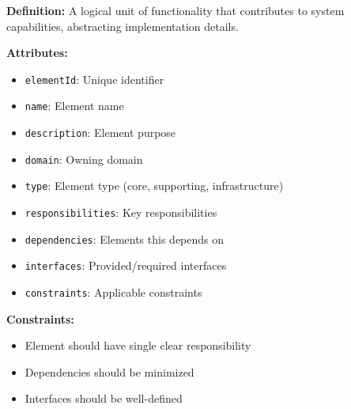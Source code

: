 \documentclass[11pt,letterpaper]{article}
\begin{document}
\begin{definitionbox}
\textbf{Definition:} A logical unit of functionality that contributes to system capabilities, abstracting implementation details.

\textbf{Attributes:}
\begin{itemize}[nosep]
    \item \texttt{elementId}: Unique identifier
    \item \texttt{name}: Element name
    \item \texttt{description}: Element purpose
    \item \texttt{domain}: Owning domain
    \item \texttt{type}: Element type (core, supporting, infrastructure)
    \item \texttt{responsibilities}: Key responsibilities
    \item \texttt{dependencies}: Elements this depends on
    \item \texttt{interfaces}: Provided/required interfaces
    \item \texttt{constraints}: Applicable constraints
\end{itemize}

\textbf{Constraints:}
\begin{itemize}[nosep]
    \item Element should have single clear responsibility
    \item Dependencies should be minimized
    \item Interfaces should be well-defined
\end{itemize}
\end{definitionbox}
\end{document}

